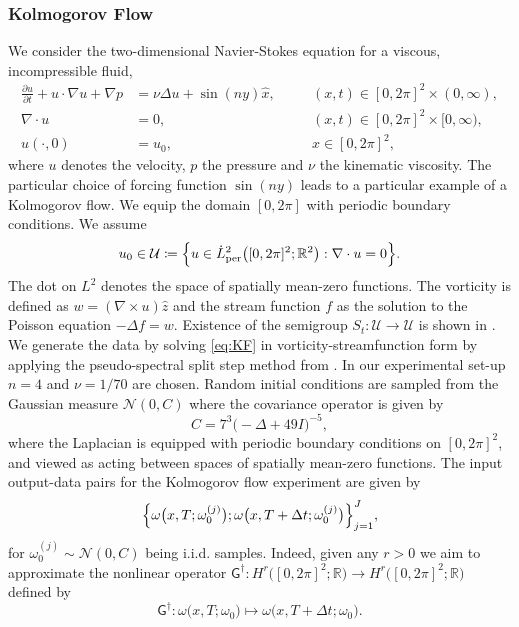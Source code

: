 \documentclass[twoside]{article}
\newcommand{\1}{\mathbbm{1}}
\newcommand{\R}{\mathbbm{R}}
\newcommand{\cN}{\mathcal{N}}
\newcommand{\cU}{\mathcal{U}}
\newcommand{\sG}{\mathsf{G}}
\providecommand{\mathbbm}{\mathbb} %
\begin{document}
\subsubsection{Kolmogorov Flow}
\label{subsubsec:NS}
We consider the two-dimensional Navier-Stokes equation for a viscous, incompressible fluid,
\begin{equation}
\label{eq:KF}
\begin{alignedat}{2}
    \frac{\partial u}{\partial t} + u\cdot\nabla u + \nabla p &= \nu \Delta u + \sin(ny)\hat{x}, &\quad& (x,t)\in [0,2\pi]^2\times(0,\infty),\\
    \nabla\cdot u &= 0, &\quad& (x,t)\in [0,2\pi]^2\times[0,\infty),\\
    u(\cdot,0)&=u_0, &\quad& x\in [0,2\pi]^2,
\end{alignedat}
\tag{KF}
\end{equation}
where $u$ denotes the velocity, $p$ the pressure and $\nu$ the kinematic viscosity. The particular choice of forcing function $\sin (ny)$ leads to a particular example of a Kolmogorov flow. We equip the domain $[0,2\pi]$ with periodic boundary conditions. We assume \[u_0 \in \cU \coloneqq \Bigl\{u\in \dot{L}^2_{\textrm{per}}\bigl( [0,2\pi]^2;\R^2\bigr) :\nabla\cdot u = 0\Bigr\}.\]
The dot on $L^2$ denotes the
space of spatially mean-zero functions.
The vorticity is defined as $w = (\nabla \times u)\widehat{z}$ and the stream function $f$ as the solution to the Poisson equation $ - \Delta f = w$. Existence of the semigroup $S_t : \cU \to \cU$ is shown in \citet[Theorem 2.1]{temam2012infinite}.
We generate the data by solving \eqref{eq:KF} in vorticity-streamfunction form by applying the pseudo-spectral split step method from \citet{Chandler_Kerswell_2013}. In our experimental set-up $n=4$ and $\nu=1/70$ are chosen. Random initial conditions are sampled from the Gaussian measure $\cN(0,C)$ where the covariance operator is given by
\[
C = 7^{3}\bigl(-\Delta +49I\bigr)^{-5},
\]
where the Laplacian is equipped with periodic boundary conditions on $[0,2\pi]^2$,
and viewed as acting  between spaces of spatially mean-zero functions. The input output-data pairs for the Kolmogorov flow experiment are given by $$\Bigl\{\omega\bigl(x,T;\omega_0^{(j)}\bigr);\omega\bigl(x,T+\Delta t;\omega_0^{(j)}\bigr)\Bigr\}_{j=1}^J,$$
for $\omega_0^{(j)}\sim \cN(0,C)$ being i.i.d. samples. Indeed, given any $r>0$ we aim to approximate the nonlinear operator $\sG^\dagger: H^r\bigl([0,2\pi]^2;\R \bigr)\to H^r\bigl([0,2\pi]^2;\R \bigr)$ defined by
\[
\sG^\dagger: \omega\bigl(x,T;\omega_0\bigr) \mapsto \omega\bigl(x,T+\Delta t;\omega_0\bigr).
\]
\end{document}
